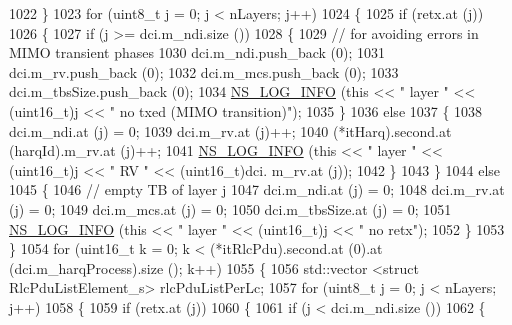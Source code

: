 \begin{DoxyCode}
1022             \}
1023           \textcolor{keywordflow}{for} (uint8\_t j = 0; j < nLayers; j++)
1024             \{
1025               \textcolor{keywordflow}{if} (retx.at (j))
1026                 \{
1027                   \textcolor{keywordflow}{if} (j >= dci.m\_ndi.size ())
1028                     \{
1029                       \textcolor{comment}{// for avoiding errors in MIMO transient phases}
1030                       dci.m\_ndi.push\_back (0);
1031                       dci.m\_rv.push\_back (0);
1032                       dci.m\_mcs.push\_back (0);
1033                       dci.m\_tbsSize.push\_back (0);
1034                       \hyperlink{group__logging_gafbd73ee2cf9f26b319f49086d8e860fb}{NS\_LOG\_INFO} (\textcolor{keyword}{this} << \textcolor{stringliteral}{" layer "} << (uint16\_t)j << \textcolor{stringliteral}{" no txed (MIMO
       transition)"});
1035                     \}
1036                   \textcolor{keywordflow}{else}
1037                     \{
1038                       dci.m\_ndi.at (j) = 0;
1039                       dci.m\_rv.at (j)++;
1040                       (*itHarq).second.at (harqId).m\_rv.at (j)++;
1041                       \hyperlink{group__logging_gafbd73ee2cf9f26b319f49086d8e860fb}{NS\_LOG\_INFO} (\textcolor{keyword}{this} << \textcolor{stringliteral}{" layer "} << (uint16\_t)j << \textcolor{stringliteral}{" RV "} << (uint16\_t)dci.
      m\_rv.at (j));
1042                     \}
1043                 \}
1044               \textcolor{keywordflow}{else}
1045                 \{
1046                   \textcolor{comment}{// empty TB of layer j}
1047                   dci.m\_ndi.at (j) = 0;
1048                   dci.m\_rv.at (j) = 0;
1049                   dci.m\_mcs.at (j) = 0;
1050                   dci.m\_tbsSize.at (j) = 0;
1051                   \hyperlink{group__logging_gafbd73ee2cf9f26b319f49086d8e860fb}{NS\_LOG\_INFO} (\textcolor{keyword}{this} << \textcolor{stringliteral}{" layer "} << (uint16\_t)j << \textcolor{stringliteral}{" no retx"});
1052                 \}
1053             \}
1054           \textcolor{keywordflow}{for} (uint16\_t k = 0; k < (*itRlcPdu).second.at (0).at (dci.m\_harqProcess).size (); k++)
1055             \{
1056               std::vector <struct RlcPduListElement\_s> rlcPduListPerLc;
1057               \textcolor{keywordflow}{for} (uint8\_t j = 0; j < nLayers; j++)
1058                 \{
1059                   \textcolor{keywordflow}{if} (retx.at (j))
1060                     \{
1061                       \textcolor{keywordflow}{if} (j < dci.m\_ndi.size ())
1062                         \{

\end{DoxyCode}
